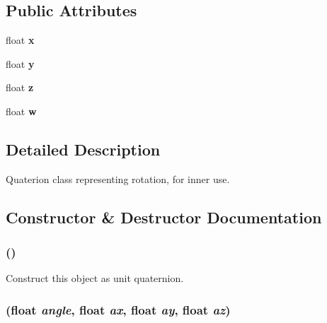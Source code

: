 \subsection*{Public Attributes}
\begin{CompactItemize}
\item 
\hypertarget{classm3g_1_1Quaternion_d0da36b2558901e21e7a30f6c227a45e}{
float \textbf{x}}
\label{classm3g_1_1Quaternion_d0da36b2558901e21e7a30f6c227a45e}

\item 
\hypertarget{classm3g_1_1Quaternion_a4f0d3eebc3c443f9be81bf48561a217}{
float \textbf{y}}
\label{classm3g_1_1Quaternion_a4f0d3eebc3c443f9be81bf48561a217}

\item 
\hypertarget{classm3g_1_1Quaternion_f73583b1e980b0aa03f9884812e9fd4d}{
float \textbf{z}}
\label{classm3g_1_1Quaternion_f73583b1e980b0aa03f9884812e9fd4d}

\item 
\hypertarget{classm3g_1_1Quaternion_56eca241e2896b9f57a79589e76fd24b}{
float \textbf{w}}
\label{classm3g_1_1Quaternion_56eca241e2896b9f57a79589e76fd24b}

\end{CompactItemize}


\subsection{Detailed Description}
Quaterion class representing rotation, for inner use. 

\subsection{Constructor \& Destructor Documentation}
\hypertarget{classm3g_1_1Quaternion_65ed15cc19af958b5933b5c522f10e66}{
\subsubsection[{Quaternion}]{ ()}}
\label{classm3g_1_1Quaternion_65ed15cc19af958b5933b5c522f10e66}


Construct this object as unit quaternion. \hypertarget{classm3g_1_1Quaternion_7a06a28b864e525f73a1bb0eb3e9274e}{
\subsubsection[{Quaternion}]{ (float {\em angle}, \/  float {\em ax}, \/  float {\em ay}, \/  float {\em az})}}
\label{classm3g_1_1Quaternion_7a06a28b864e525f73a1bb0eb3e9274e}



